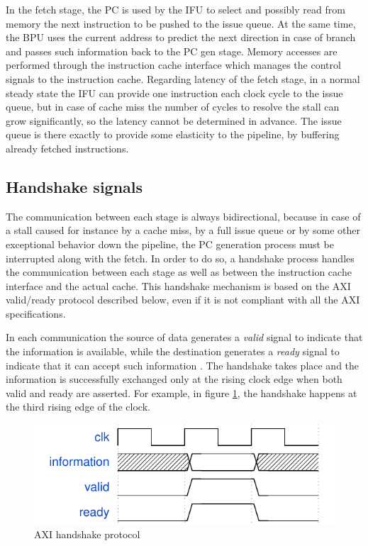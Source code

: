In the fetch stage, the \ac{PC} is used by the \ac{IFU} to select and possibly read from memory the next instruction to be pushed to the issue queue. At the same time, the \ac{BPU} uses the current address to predict the next direction in case of branch and passes such information back to the \ac{PC} gen stage. Memory accesses are performed through the instruction cache interface which manages the control signals to the instruction cache. Regarding latency of the fetch stage, in a normal steady state the \ac{IFU} can provide one instruction each clock cycle to the issue queue, but in case of cache miss the number of cycles to resolve the stall can grow significantly, so the latency cannot be determined in advance. The issue queue is there exactly to provide some elasticity to the pipeline, by buffering already fetched instructions.

\subsection{Handshake signals}\label{sec:handshake}
The communication between each stage is always bidirectional, because in case of a stall caused for instance by a cache miss, by a full issue queue or by some other exceptional behavior down the pipeline, the \ac{PC} generation process must be interrupted along with the fetch. In order to do so, a handshake process handles the communication between each stage as well as between the instruction cache interface and the actual cache. This handshake mechanism is based on the {\smaller AXI} valid/ready protocol described below, even if it is not compliant with all the {\smaller AXI} specifications.

In each communication the source of data generates a \emph{valid} signal to indicate that the information is available, while the destination generates a \emph{ready} signal to indicate that it can accept such information \cite[p.~A3-41]{axi}. The handshake takes place and the information is successfully exchanged only at the rising clock edge when both valid and ready are asserted. For example, in figure \ref{fig:axi}, the handshake happens at the third rising edge of the clock.
\begin{figure}[hbt]
  \centering
  \includegraphics{img/axi.pdf}
  \caption{AXI handshake protocol}
  \label{fig:axi}
\end{figure}


